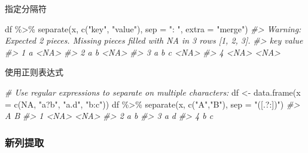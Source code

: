 \documentclass[
]{book}
\newenvironment{Shaded}{\begin{snugshade}}{\end{snugshade}}
\newcommand{\AttributeTok}[1]{\textcolor[rgb]{0.77,0.63,0.00}{#1}}
\newcommand{\CommentTok}[1]{\textcolor[rgb]{0.56,0.35,0.01}{\textit{#1}}}
\newcommand{\ConstantTok}[1]{\textcolor[rgb]{0.00,0.00,0.00}{#1}}
\newcommand{\FunctionTok}[1]{\textcolor[rgb]{0.00,0.00,0.00}{#1}}
\newcommand{\NormalTok}[1]{#1}
\newcommand{\OtherTok}[1]{\textcolor[rgb]{0.56,0.35,0.01}{#1}}
\newcommand{\SpecialCharTok}[1]{\textcolor[rgb]{0.00,0.00,0.00}{#1}}
\newcommand{\StringTok}[1]{\textcolor[rgb]{0.31,0.60,0.02}{#1}}
\begin{document}
指定分隔符

\begin{Shaded}
\begin{Highlighting}[]
\NormalTok{df }\SpecialCharTok{\%\textgreater{}\%} \FunctionTok{separate}\NormalTok{(x, }\FunctionTok{c}\NormalTok{(}\StringTok{"key"}\NormalTok{, }\StringTok{"value"}\NormalTok{), }\AttributeTok{sep =} \StringTok{": "}\NormalTok{, }\AttributeTok{extra =} \StringTok{"merge"}\NormalTok{)}
\CommentTok{\#\textgreater{} Warning: Expected 2 pieces. Missing pieces filled with \textasciigrave{}NA\textasciigrave{} in 3 rows [1, 2, 3].}
\CommentTok{\#\textgreater{}     key value}
\CommentTok{\#\textgreater{} 1     a  \textless{}NA\textgreater{}}
\CommentTok{\#\textgreater{} 2   a b  \textless{}NA\textgreater{}}
\CommentTok{\#\textgreater{} 3 a b c  \textless{}NA\textgreater{}}
\CommentTok{\#\textgreater{} 4  \textless{}NA\textgreater{}  \textless{}NA\textgreater{}}
\end{Highlighting}
\end{Shaded}

使用正则表达式

\begin{Shaded}
\begin{Highlighting}[]
\CommentTok{\# Use regular expressions to separate on multiple characters:}
\NormalTok{df }\OtherTok{\textless{}{-}} \FunctionTok{data.frame}\NormalTok{(}\AttributeTok{x =} \FunctionTok{c}\NormalTok{(}\ConstantTok{NA}\NormalTok{, }\StringTok{"a?b"}\NormalTok{, }\StringTok{"a.d"}\NormalTok{, }\StringTok{"b:c"}\NormalTok{))}
\NormalTok{df }\SpecialCharTok{\%\textgreater{}\%} \FunctionTok{separate}\NormalTok{(x, }\FunctionTok{c}\NormalTok{(}\StringTok{"A"}\NormalTok{,}\StringTok{"B"}\NormalTok{), }\AttributeTok{sep =} \StringTok{"([.?:])"}\NormalTok{)}
\CommentTok{\#\textgreater{}      A    B}
\CommentTok{\#\textgreater{} 1 \textless{}NA\textgreater{} \textless{}NA\textgreater{}}
\CommentTok{\#\textgreater{} 2    a    b}
\CommentTok{\#\textgreater{} 3    a    d}
\CommentTok{\#\textgreater{} 4    b    c}
\end{Highlighting}
\end{Shaded}

\hypertarget{ux65b0ux5217ux63d0ux53d6}{%
\subsubsection{新列提取}\label{ux65b0ux5217ux63d0ux53d6}}
\end{document}
